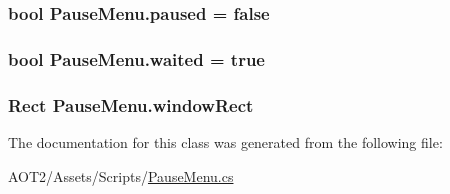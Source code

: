 \subsubsection[{paused}]{\setlength{\rightskip}{0pt plus 5cm}bool Pause\+Menu.\+paused = false\hspace{0.3cm}{\ttfamily [private]}}\label{class_pause_menu_a5ebc8c7d38ad3c1be68a741fb133e6a2}
\hypertarget{class_pause_menu_a73081e2e0173f8cda0bb890d4b84b722}{}
\subsubsection[{waited}]{\setlength{\rightskip}{0pt plus 5cm}bool Pause\+Menu.\+waited = true\hspace{0.3cm}{\ttfamily [private]}}\label{class_pause_menu_a73081e2e0173f8cda0bb890d4b84b722}
\hypertarget{class_pause_menu_a5cbd090dfd1fd8cd9d745d1334dad5cb}{}
\subsubsection[{window\+Rect}]{\setlength{\rightskip}{0pt plus 5cm}Rect Pause\+Menu.\+window\+Rect\hspace{0.3cm}{\ttfamily [private]}}\label{class_pause_menu_a5cbd090dfd1fd8cd9d745d1334dad5cb}


The documentation for this class was generated from the following file\+:\begin{DoxyCompactItemize}
\item 
A\+O\+T2/\+Assets/\+Scripts/\hyperlink{_pause_menu_8cs}{Pause\+Menu.\+cs}\end{DoxyCompactItemize}
